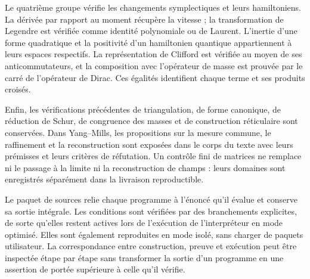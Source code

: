 Le quatrième groupe vérifie les changements symplectiques et leurs
hamiltoniens. La dérivée par rapport au moment récupère la
vitesse ; la transformation de Legendre est vérifiée comme
identité polynomiale ou de Laurent. L’inertie d’une forme
quadratique et la positivité d’un hamiltonien quantique
appartiennent à leurs espaces respectifs. La représentation
de Clifford est vérifiée au moyen de ses anticommutateurs,
et la composition avec l’opérateur de masse est prouvée par
le carré de l’opérateur de Dirac. Ces égalités
identifient chaque terme et ses produits croisés.

Enfin, les vérifications précédentes de triangulation, de forme canonique, de réduction de Schur, de congruence des masses et de construction réticulaire sont conservées. Dans Yang--Mills, les propositions sur la mesure commune, le raffinement et la reconstruction sont exposées dans le corps du texte avec leurs prémisses et leurs critères de réfutation. Un contrôle fini de matrices ne remplace ni le passage à la limite ni la reconstruction de champs : leurs domaines sont enregistrés séparément dans la livraison reproductible.

Le paquet de sources relie chaque programme à l’énoncé
qu’il évalue et conserve sa sortie intégrale. Les conditions sont
vérifiées par des branchements explicites, de sorte qu’elles
restent actives lors de l’exécution de l’interpréteur en mode
optimisé. Elles sont également reproduites en mode isolé, sans
charger de paquets utilisateur. La correspondance entre
construction, preuve et exécution peut être inspectée
étape par étape sans transformer la sortie d’un programme en
une assertion de portée supérieure à celle qu’il vérifie.
